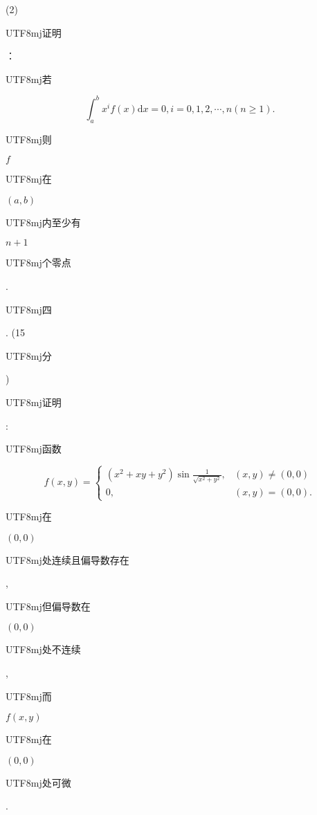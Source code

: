 \documentclass[10pt]{article}
\begin{document}
(2) \begin{CJK}{UTF8}{mj}证明\end{CJK}：\begin{CJK}{UTF8}{mj}若\end{CJK}
$$
\int_{a}^{b} x^{i} f(x) \mathrm{d} x=0, i=0,1,2, \cdots, n(n \geqslant 1) .
$$
\begin{CJK}{UTF8}{mj}则\end{CJK} $f$ \begin{CJK}{UTF8}{mj}在\end{CJK} $(a, b)$ \begin{CJK}{UTF8}{mj}内至少有\end{CJK} $n+1$ \begin{CJK}{UTF8}{mj}个零点\end{CJK}. \begin{CJK}{UTF8}{mj}四\end{CJK}. (15 \begin{CJK}{UTF8}{mj}分\end{CJK}) \begin{CJK}{UTF8}{mj}证明\end{CJK}: \begin{CJK}{UTF8}{mj}函数\end{CJK}
$$
f(x, y)= \begin{cases}\left(x^{2}+x y+y^{2}\right) \sin \frac{1}{\sqrt{x^{2}+y^{2}}}, & (x, y) \neq(0,0) \\ 0, & (x, y)=(0,0) .\end{cases}
$$
\begin{CJK}{UTF8}{mj}在\end{CJK} $(0,0)$ \begin{CJK}{UTF8}{mj}处连续且偏导数存在\end{CJK}, \begin{CJK}{UTF8}{mj}但偏导数在\end{CJK} $(0,0)$ \begin{CJK}{UTF8}{mj}处不连续\end{CJK}, \begin{CJK}{UTF8}{mj}而\end{CJK} $f(x, y)$ \begin{CJK}{UTF8}{mj}在\end{CJK} $(0,0)$ \begin{CJK}{UTF8}{mj}处可微\end{CJK}.
\end{document}
